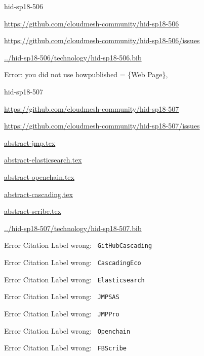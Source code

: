 \begin{IU}

hid-sp18-506

\url{https://github.com/cloudmesh-community/hid-sp18-506}

\url{https://github.com/cloudmesh-community/hid-sp18-506/issues}

\href{https://github.com/cloudmesh-community/hid-sp18-506/blob/master//technology/hid-sp18-506.bib}{../hid-sp18-506/technology/hid-sp18-506.bib}

Error: you did not use howpublished = \{Web Page\},

\end{IU}


\begin{IU}

hid-sp18-507

\url{https://github.com/cloudmesh-community/hid-sp18-507}

\url{https://github.com/cloudmesh-community/hid-sp18-507/issues}

\href{https://github.com/cloudmesh-community/hid-sp18-507/blob/master//technology/abstract-jmp.tex}{abstract-jmp.tex}

\href{https://github.com/cloudmesh-community/hid-sp18-507/blob/master//technology/abstract-elasticsearch.tex}{abstract-elasticsearch.tex}

\href{https://github.com/cloudmesh-community/hid-sp18-507/blob/master//technology/abstract-openchain.tex}{abstract-openchain.tex}

\href{https://github.com/cloudmesh-community/hid-sp18-507/blob/master//technology/abstract-cascading.tex}{abstract-cascading.tex}

\href{https://github.com/cloudmesh-community/hid-sp18-507/blob/master//technology/abstract-scribe.tex}{abstract-scribe.tex}

\href{https://github.com/cloudmesh-community/hid-sp18-507/blob/master//technology/hid-sp18-507.bib}{../hid-sp18-507/technology/hid-sp18-507.bib}

 Error Citation Label wrong: \verb| GitHubCascading |

 Error Citation Label wrong: \verb| CascadingEco |

 Error Citation Label wrong: \verb| Elasticsearch |

 Error Citation Label wrong: \verb| JMPSAS |

 Error Citation Label wrong: \verb| JMPPro |

 Error Citation Label wrong: \verb| Openchain |

 Error Citation Label wrong: \verb| FBScribe |

\end{IU}


